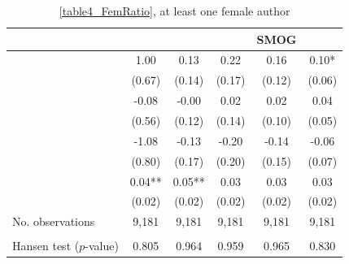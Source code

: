 \begin{table}
    \footnotesize
    \centering
    \begin{threeparttable}
        \caption{\autoref{table4_FemRatio}, at least one female author}
        \label{table4_Fem1}
        \begin{tabular}{p{4cm}S@{}S@{}S@{}S@{}S@{}}
            \toprule
            &{}&{}&{}&{SMOG}&{}\\
            \midrule
            &        1.00   &        0.13   &        0.22   &        0.16   &        0.10*  \\
                                          &      {(0.67)}   &      {(0.14)}   &      {(0.17)}   &      {(0.12)}   &      {(0.06)}   \\
            &       -0.08   &       -0.00   &        0.02   &        0.02   &        0.04   \\
                                          &      {(0.56)}   &      {(0.12)}   &      {(0.14)}   &      {(0.10)}   &      {(0.05)}   \\
            &       -1.08   &       -0.13   &       -0.20   &       -0.14   &       -0.06   \\
                                          &      {(0.80)}   &      {(0.17)}   &      {(0.20)}   &      {(0.15)}   &      {(0.07)}   \\
            &        0.04** &        0.05** &        0.03   &        0.03   &        0.03   \\
                                          &      {(0.02)}   &      {(0.02)}   &      {(0.02)}   &      {(0.02)}   &      {(0.02)}   \\
            \midrule
            No. observations      &       9,181   &       9,181   &       9,181   &       9,181   &       9,181   \\
             \\\quad Hansen test (\(p\)-value)&       0.805   &       0.964   &       0.959   &       0.965   &       0.830   \\

\end{tabular}
\end{threeparttable}
\end{table}
